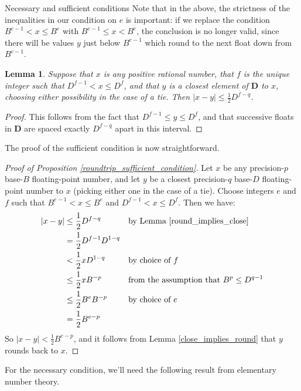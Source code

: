 \documentclass{article}
\theoremstyle{plain}
\newtheorem{lemma}{Lemma}
\theoremstyle{definition}
\begin{document}
\begin{section}{Necessary and sufficient conditions}
Note that in the above, the strictness of the inequalities in our condition on
$e$ is important: if we replace the condition $B^{e-1} < x \le B^e$ with
$B^{e-1}\le x < B^e$, the conclusion is no longer valid, since there will be
values $y$ just below $B^{e-1}$ which round to the next float down from
$B^{e-1}$.

\begin{lemma}
  \label{round_implies_close}
  Suppose that $x$ is any positive rational number, that $f$ is the unique
  integer such that $D^{f-1} < x \le D^f$, and that $y$ is a closest element of
  $\mathbf D$ to $x$, choosing either possibility in the case of a tie. Then
  $|x - y| \le \frac12 D^{f-q}$.
\end{lemma}

\begin{proof}
  This follows from the fact that $D^{f-1} \le y \le D^f$, and that successive
  floats in $\mathbf D$ are spaced exactly $D^{f-q}$ apart in this interval.
\end{proof}

The proof of the sufficient condition is now straightforward.

\begin{proof}[Proof of Proposition \ref{roundtrip_sufficient_condition}]
  Let $x$ be any precision-$p$ base-$B$ floating-point number, and let $y$ be a
  closest precision-$q$ base-$D$ floating-point number to $x$ (picking either
  one in the case of a tie).  Choose integers $e$ and $f$ such that $B^{e-1} <
  x \le B^e$ and $D^{f-1} < x \le D^f$. Then we have:
  \begin{align*}
    |x - y|
    &\le \frac12 D^{f-q} && \text{by Lemma \ref{round_implies_close}}\\
    &= \frac12 D^{f-1} D^{1-q} \\
    &< \frac12 x D^{1-q} && \text{by choice of $f$}\\
    &\le \frac12 x B^{-p} &&
                   \text{from the assumption that $B^p \le D^{q-1}$}\\
    &\le \frac12 B^e B^{-p} && \text{by choice of $e$}\\
    &= \frac12 B^{e-p} \\
  \end{align*}
  So $|x - y| < \frac12 B^{e-p}$, and it follows from Lemma
  \ref{close_implies_round} that $y$ rounds back to $x$.
\end{proof}

For the necessary condition, we'll need the following result from elementary
number theory.


\end{section}
\end{document}
